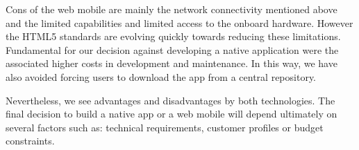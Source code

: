 Cons of the web mobile are mainly the network connectivity mentioned above and the limited capabilities and limited access to the onboard hardware. However the HTML5 standards are evolving quickly towards reducing these limitations. Fundamental for our decision against developing a native application were the associated higher costs in development and maintenance. In this way, we have also avoided forcing users to download the app from a central repository.

Nevertheless, we see advantages and disadvantages by both technologies. The final decision to build a native app or a web mobile will depend ultimately on several factors such as: technical requirements, customer profiles or budget constraints.


